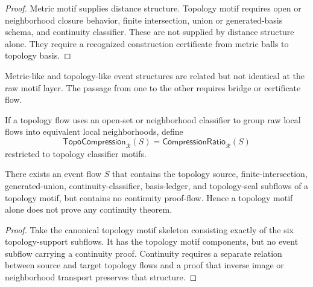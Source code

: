 \begin{proof}
Metric motif supplies distance structure. Topology motif requires open or neighborhood closure behavior, finite intersection, union or generated-basis schema, and continuity classifier. These are not supplied by distance structure alone. They require a recognized construction certificate from metric balls to topology basis.
\end{proof}

\begin{corollary}
\label{cor:higher-case-metric-not-automatic-topology}
Metric-like and topology-like event structures are related but not identical at the raw motif layer. The passage from one to the other requires bridge or certificate flow.
\end{corollary}

\begin{definition}
\label{def:higher-case-topological-compression}
If a topology flow uses an open-set or neighborhood classifier to group raw local flows into equivalent local neighborhoods, define
$$
  \mathsf{TopoCompression}_{\mathcal R}(S)
  =
  \mathsf{CompressionRatio}_{\mathcal R}(S)
$$
restricted to topology classifier motifs.
\end{definition}

\begin{theorem}
\label{thm:higher-case-topology-not-continuity}
There exists an event flow $S$ that contains the topology source, finite-intersection, generated-union, continuity-classifier, basis-ledger, and topology-seal subflows of a topology motif, but contains no continuity proof-flow. Hence a topology motif alone does not prove any continuity theorem.
\end{theorem}

\begin{proof}
Take the canonical topology motif skeleton consisting exactly of the six topology-support subflows. It has the topology motif components, but no event subflow carrying a continuity proof. Continuity requires a separate relation between source and target topology flows and a proof that inverse image or neighborhood transport preserves that structure.
\end{proof}

